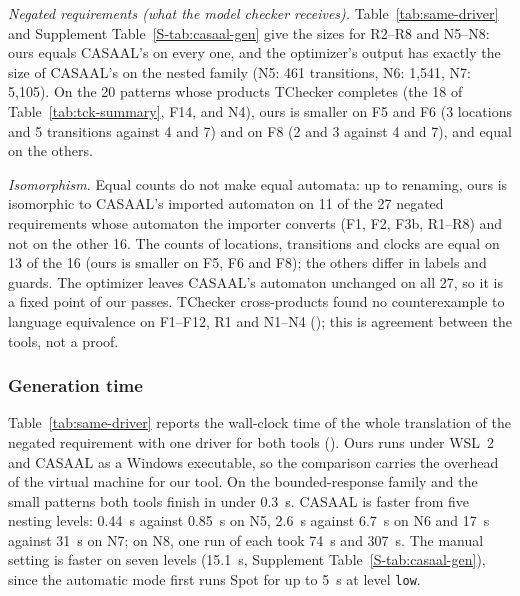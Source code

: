 \emph{Negated requirements (what the model checker receives).} Table~\ref{tab:same-driver} and Supplement Table~\ref{S-tab:casaal-gen} give the sizes for R2--R8 and N5--N8: ours equals CASAAL's on every one, and the optimizer's output has exactly the size of CASAAL's on the nested family (N5: 461 transitions, N6: 1,541, N7: 5,105). On the 20 patterns whose products TChecker completes (the 18 of Table~\ref{tab:tck-summary}, F14, and N4), ours is smaller on F5 and F6 (3 locations and 5 transitions against 4 and 7) and on F8 (2 and 3 against 4 and 7), and equal on the others.

\emph{Isomorphism.} Equal counts do not make equal automata: up to renaming, ours is isomorphic to CASAAL's imported automaton on 11 of the 27 negated requirements whose automaton the importer converts (F1, F2, F3b, R1--R8) and not on the other 16. The counts of locations, transitions and clocks are equal on 13 of the 16 (ours is smaller on F5, F6 and F8); the others differ in labels and guards. The optimizer leaves CASAAL's automaton unchanged on all 27, so it is a fixed point of our passes. TChecker cross-products found no counterexample to language equivalence on F1--F12, R1 and N1--N4 (); this is agreement between the tools, not a proof.

\subsubsection{Generation time}
\label{sec:casaal-time}
\begin{table}[tp]
\centering
\caption{Negated requirements: CASAAL against \texttt{mtl2tba}. Size is reachable
locations/transitions of the automaton given to the model checker (ours: after
optimization). Times are wall-clock medians of five runs for the whole translation
(for ours: generation, optimization and export, in automatic mode), both tools launched
by one driver on the same machine, CASAAL as the native Windows executable and ours under
WSL~2. N8 is a single run of each tool. The rows are a selection; the other patterns are in the supplement. Supplement Table~\ref{S-tab:casaal-gen}
gives earlier runs, with the manual setting.}
\label{tab:same-driver}
\small

\end{table}
Table~\ref{tab:same-driver} reports the wall-clock time of the whole translation of the negated requirement with one driver for both tools (). Ours runs under WSL~2 and CASAAL as a Windows executable, so the comparison carries the overhead of the virtual machine for our tool. On the bounded-response family and the small patterns both tools finish in under 0.3~s. CASAAL is faster from five nesting levels: 0.44~s against 0.85~s on N5, 2.6~s against 6.7~s on N6 and 17~s against 31~s on N7; on N8, one run of each took 74~s and 307~s. The manual setting is faster on seven levels (15.1~s, Supplement Table~\ref{S-tab:casaal-gen}), since the automatic mode first runs Spot for up to 5~s at level \texttt{low}.

